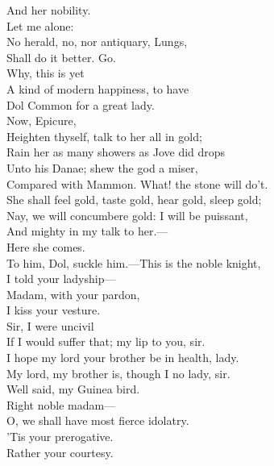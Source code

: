 \documentclass[a4paper,oneside]{memoir}
\begin{document}
\begin{drama*}
And her nobility.\\
\mammonspeaks {} Let me alone:\\
No herald, no, nor antiquary, Lungs,\\
Shall do it better. Go.\\
\facespeaks {} Why, this is yet\\
A kind of modern happiness, to have\\
Dol Common for a great lady.\\
\mammonspeaks {} Now, Epicure,\\
Heighten thyself, talk to her all in gold;\\
Rain her as many showers as Jove did drops\\
Unto his Danae; shew the god a miser,\\
Compared with Mammon. What! the stone will do't.\\
She shall feel gold, taste gold, hear gold, sleep gold;\\
Nay, we will concumbere gold: I will be puissant,\\
And mighty in my talk to her.---\\
Here she comes.\\
\facespeaks {} To him, Dol, suckle him.---This is the noble knight,\\
I told your ladyship---\\
\mammonspeaks {} Madam, with your pardon,\\
I kiss your vesture.\\
\dolspeaks {} Sir, I were uncivil\\
If I would suffer that; my lip to you, sir.\\
\mammonspeaks I hope my lord your brother be in health, lady.\\
\dolspeaks My lord, my brother is, though I no lady, sir.\\
\facespeaks {} Well said, my Guinea bird.\\
\mammonspeaks Right noble madam---\\
\facespeaks {} O, we shall have most fierce idolatry.\\
\mammonspeaks {} 'Tis your prerogative.\\
\dolspeaks Rather your courtesy.\\

\end{drama*}
\end{document}
